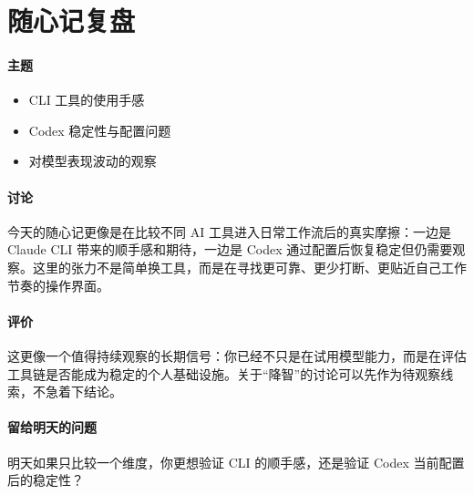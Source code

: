 \documentclass[UTF8,zihao=-4]{ctexart}
\begin{document}
\section*{随心记复盘}
\paragraph{主题}
\begin{itemize}[leftmargin=2em]
\item CLI 工具的使用手感
\item Codex 稳定性与配置问题
\item 对模型表现波动的观察
\end{itemize}
\paragraph{讨论} 今天的随心记更像是在比较不同 AI 工具进入日常工作流后的真实摩擦：一边是 Claude CLI 带来的顺手感和期待，一边是 Codex 通过配置后恢复稳定但仍需要观察。这里的张力不是简单换工具，而是在寻找更可靠、更少打断、更贴近自己工作节奏的操作界面。
\paragraph{评价} 这更像一个值得持续观察的长期信号：你已经不只是在试用模型能力，而是在评估工具链是否能成为稳定的个人基础设施。关于“降智”的讨论可以先作为待观察线索，不急着下结论。
\paragraph{留给明天的问题} 明天如果只比较一个维度，你更想验证 CLI 的顺手感，还是验证 Codex 当前配置后的稳定性？
\end{document}
